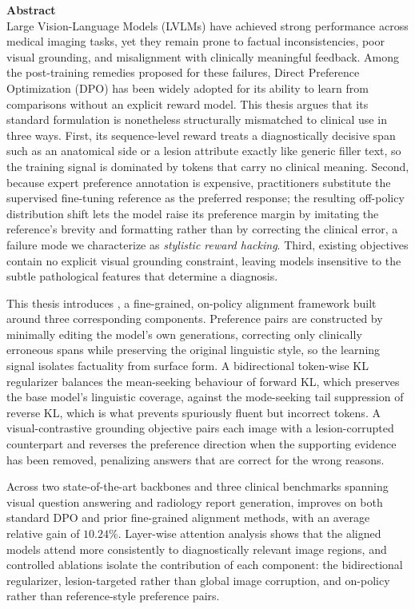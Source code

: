 \textbf{Abstract}\\

Large Vision-Language Models (LVLMs) have achieved strong performance across medical imaging tasks, yet they remain prone to factual inconsistencies, poor visual grounding, and misalignment with clinically meaningful feedback. Among the post-training remedies proposed for these failures, Direct Preference Optimization (DPO) has been widely adopted for its ability to learn from comparisons without an explicit reward model. This thesis argues that its standard formulation is nonetheless structurally mismatched to clinical use in three ways. First, its sequence-level reward treats a diagnostically decisive span such as an anatomical side or a lesion attribute exactly like generic filler text, so the training signal is dominated by tokens that carry no clinical meaning. Second, because expert preference annotation is expensive, practitioners substitute the supervised fine-tuning reference as the preferred response; the resulting off-policy distribution shift lets the model raise its preference margin by imitating the reference's brevity and formatting rather than by correcting the clinical error, a failure mode we characterize as \emph{stylistic reward hacking}. Third, existing objectives contain no explicit visual grounding constraint, leaving models insensitive to the subtle pathological features that determine a diagnosis.

This thesis introduces \ourloss{}, a fine-grained, on-policy alignment framework built around three corresponding components. Preference pairs are constructed by minimally editing the model's own generations, correcting only clinically erroneous spans while preserving the original linguistic style, so the learning signal isolates factuality from surface form. A bidirectional token-wise KL regularizer balances the mean-seeking behaviour of forward KL, which preserves the base model's linguistic coverage, against the mode-seeking tail suppression of reverse KL, which is what prevents spuriously fluent but incorrect tokens. A visual-contrastive grounding objective pairs each image with a lesion-corrupted counterpart and reverses the preference direction when the supporting evidence has been removed, penalizing answers that are correct for the wrong reasons.

Across two state-of-the-art backbones and three clinical benchmarks spanning visual question answering and radiology report generation, \ourloss{} improves on both standard DPO and prior fine-grained alignment methods, with an average relative gain of $10.24\%$. Layer-wise attention analysis shows that the aligned models attend more consistently to diagnostically relevant image regions, and controlled ablations isolate the contribution of each component: the bidirectional regularizer, lesion-targeted rather than global image corruption, and on-policy rather than reference-style preference pairs.
